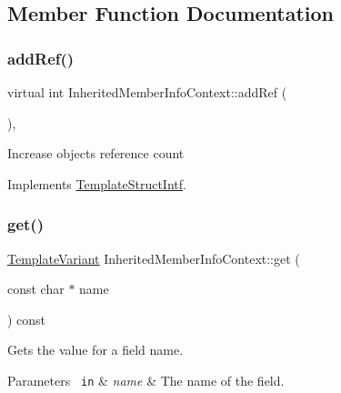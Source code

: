 \subsection{Member Function Documentation}
\mbox{\label{class_inherited_member_info_context_a38bbd0b70b99adbf488dbf2e72753a51}} 
\subsubsection{\texorpdfstring{addRef()}{addRef()}}
{\footnotesize\ttfamily virtual int Inherited\+Member\+Info\+Context\+::add\+Ref (\begin{DoxyParamCaption}{ }\end{DoxyParamCaption})\hspace{0.3cm}{\ttfamily [inline]}, {\ttfamily [virtual]}}

Increase object\textquotesingle{}s reference count 

Implements \mbox{\hyperlink{class_template_struct_intf_a05fe97ad47633beb326f69686faed581}{Template\+Struct\+Intf}}.

\mbox{\label{class_inherited_member_info_context_a6db282829170c4fcca2a8c77eeb9fda5}} 
\subsubsection{\texorpdfstring{get()}{get()}}
{\footnotesize\ttfamily \mbox{\hyperlink{class_template_variant}{Template\+Variant}} Inherited\+Member\+Info\+Context\+::get (\begin{DoxyParamCaption}\item[{const char $\ast$}]{name }\end{DoxyParamCaption}) const\hspace{0.3cm}{\ttfamily [virtual]}}

Gets the value for a field name. 
\begin{DoxyParams}[1]{Parameters}
\mbox{\texttt{ in}}  & {\em name} & The name of the field. \\
\hline
\end{DoxyParams}


